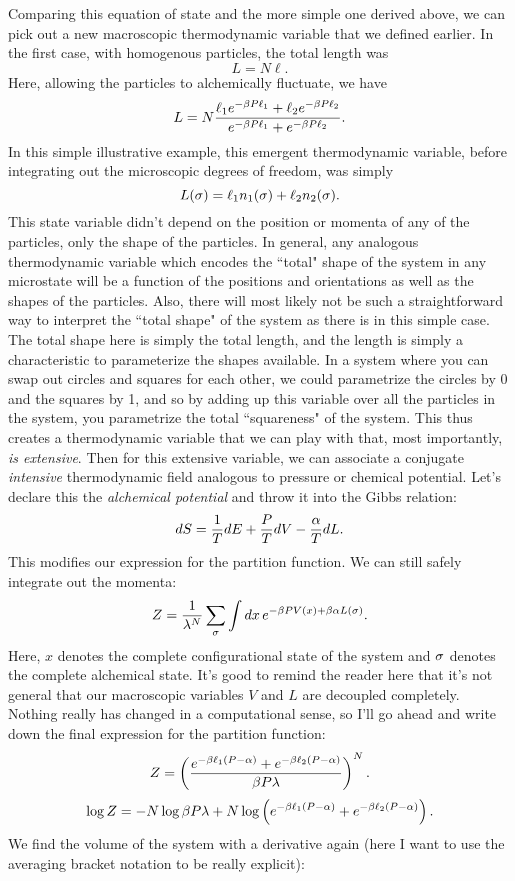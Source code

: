 \documentclass[12pt]{article}
\begin{document}
Comparing this equation of state and the more simple one derived above, we can pick out a new macroscopic thermodynamic variable that we defined earlier. In the first case, with homogenous particles, the total length was
\[ L = N \ell.\]
Here, allowing the particles to alchemically fluctuate, we have
\[ L = N\frac{\ell_1 e^{-\beta P \ell_1} + \ell_2e^{-\beta P \ell_2}}{e^{-\beta P \ell_1} + e^{-\beta P \ell_2}}.\]
In this simple illustrative example, this emergent thermodynamic variable, before integrating out the microscopic degrees of freedom, was simply
\[ L(\sigma) = \ell_1 n_1(\sigma) + \ell_2 n_2(\sigma).\]
This state variable didn't depend on the position or momenta of any of the particles, only the shape of the particles. In general, any analogous thermodynamic variable which encodes the ``total" shape of the system in any microstate will be a function of the positions and orientations as well as the shapes of the particles. Also, there will most likely not be such a straightforward way to interpret the ``total shape" of the system as there is in this simple case. The total shape here is simply the total length, and the length is simply a characteristic to parameterize the shapes available. In a system where you can swap out circles and squares for each other, we could parametrize the circles by 0 and the squares by 1, and so by adding up this variable over all the particles in the system, you parametrize the total ``squareness" of the system. This thus creates a thermodynamic variable that we can play with that, most importantly, \emph{is extensive}. Then for this extensive variable, we can associate a conjugate \emph{intensive} thermodynamic field analogous to pressure or chemical potential. Let's declare this the \emph{alchemical potential} and throw it into the Gibbs relation:
\[ dS = \frac{1}{T} dE + \frac{P}{T} dV - \frac{\alpha}{T} dL.\]
This modifies our expression for the partition function. We can still safely integrate out the momenta:
\[ Z = \frac{1}{\lambda^N} \sum_\sigma \int dx \, e^{-\beta P V(x) + \beta \alpha L(\sigma)}.\]
Here, $x$ denotes the complete configurational state of the system and $\sigma$ denotes the complete alchemical state. It's good to remind the reader here that it's not general that our macroscopic variables $V$ and $L$ are decoupled completely. Nothing really has changed in a computational sense, so I'll go ahead and write down the final expression for the partition function:
\[ Z = \left(\frac{e^{-\beta \ell_1 (P - \alpha)} + e^{-\beta \ell_2 (P-\alpha)}}{\beta P \lambda}\right)^N.\]
\[ \log Z = -N \log \beta P \lambda + N \log \left(e^{-\beta \ell_1 (P - \alpha)} + e^{-\beta \ell_2 (P-\alpha)}\right).\]
We find the volume of the system with a derivative again (here I want to use the averaging bracket notation to be really explicit):
\end{document}
